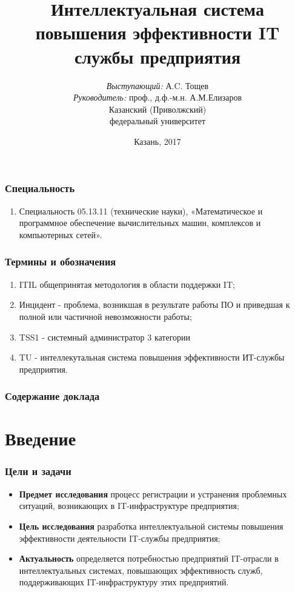 \documentclass[14pt]{beamer}
\title{\small{Интеллектуальная система повышения эффективности IT службы предприятия}}
\author{\small{%
\emph{Выступающий:} А.C. Тощев\\%
\emph{Руководитель:} проф., д.ф.-м.н. А.М.Елизаров}\\%
\vspace{30pt}%
Казанский (Приволжский)\\
федеральный университет%
\vspace{20pt}%
}
\date{\small{Казань, 2017}}
\begin{document}
\maketitle

\begin{frame}
\frametitle{Специальность}
\begin{enumerate}
    \item Специальность 05.13.11 (технические науки), «Математическое и программное обеспечение вычислительных машин, комплексов и компьютерных сетей».
\end{enumerate}
\end{frame}


\begin{frame}
\frametitle{Термины и обозначения}
\begin{enumerate}
    \item ITIL общепринятая методология в области поддержки IT;
    \item Инцидент - проблема, возникшая в результате работы ПО и приведшая к полной или частичной невозможности работы;
    \item TSS1 - системный администратор 3 категории
    \item TU - интеллекутальная система повышения эффективности ИТ-службы предприятия.
  
\end{enumerate}
\end{frame}


  \begin{frame}
   \frametitle{Содержание доклада}
    \tableofcontents
   \end{frame}


\AtBeginSection[] %
{
\begin{frame}
\frametitle{}
\tableofcontents[current]
	
\end{frame}
}
% 
%
\section[Введение]{Введение}

\begin{frame}
\frametitle{Цели и задачи}
\begin{itemize}
  \item \textbf{Предмет исследования} процесс регистрации и устранения проблемных ситуаций, возникающих в IT-инфраструктуре предприятия;
  \item \textbf{Цель исследования} разработка интеллектуальной системы повышения эффективности деятельности IT-службы предприятия;
  \item \textbf{Актуальность} определяется потребностью предприятий IT-отрасли в интеллектуальных системах, повышающих эффективность служб, поддерживающих IT-инфраструктуру этих предприятий.
\end{itemize}
\end{frame}
\end{document}
